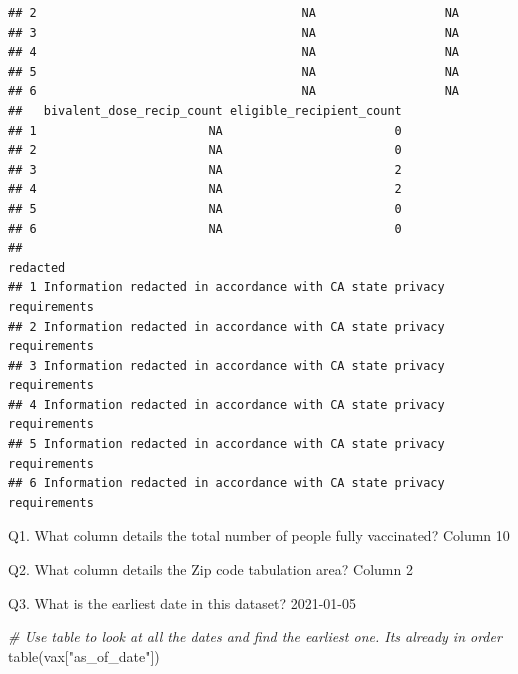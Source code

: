 \documentclass[
]{article}
\newenvironment{Shaded}{\begin{snugshade}}{\end{snugshade}}
\newcommand{\CommentTok}[1]{\textcolor[rgb]{0.56,0.35,0.01}{\textit{#1}}}
\newcommand{\FunctionTok}[1]{\textcolor[rgb]{0.00,0.00,0.00}{#1}}
\newcommand{\NormalTok}[1]{#1}
\newcommand{\StringTok}[1]{\textcolor[rgb]{0.31,0.60,0.02}{#1}}
\begin{document}
\begin{verbatim}
## 2                                     NA                  NA
## 3                                     NA                  NA
## 4                                     NA                  NA
## 5                                     NA                  NA
## 6                                     NA                  NA
##   bivalent_dose_recip_count eligible_recipient_count
## 1                        NA                        0
## 2                        NA                        0
## 3                        NA                        2
## 4                        NA                        2
## 5                        NA                        0
## 6                        NA                        0
##                                                                redacted
## 1 Information redacted in accordance with CA state privacy requirements
## 2 Information redacted in accordance with CA state privacy requirements
## 3 Information redacted in accordance with CA state privacy requirements
## 4 Information redacted in accordance with CA state privacy requirements
## 5 Information redacted in accordance with CA state privacy requirements
## 6 Information redacted in accordance with CA state privacy requirements
\end{verbatim}

Q1. What column details the total number of people fully vaccinated?
Column 10

Q2. What column details the Zip code tabulation area? Column 2

Q3. What is the earliest date in this dataset? 2021-01-05

\begin{Shaded}
\begin{Highlighting}[]
\CommentTok{\# Use table to look at all the dates and find the earliest one. It\textquotesingle{}s already in order}
\FunctionTok{table}\NormalTok{(vax[}\StringTok{"as\_of\_date"}\NormalTok{])}
\end{Highlighting}
\end{Shaded}
\end{document}
